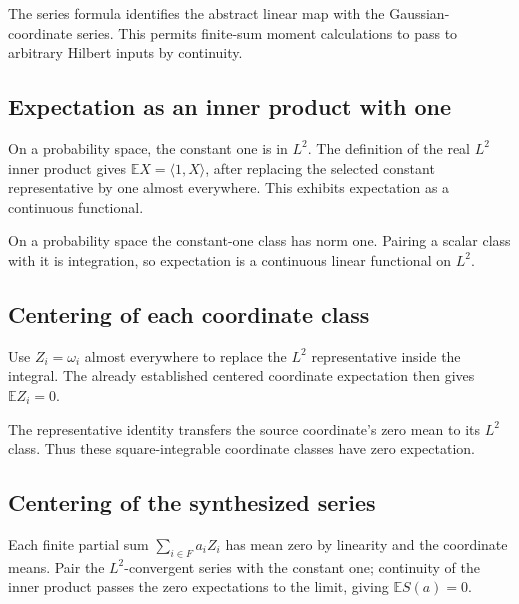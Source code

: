 \documentclass[11pt,a4paper]{report}
\begin{document}
The series formula identifies the abstract linear map with the Gaussian-coordinate series. This permits finite-sum moment calculations to pass to arbitrary Hilbert inputs by continuity.

\subsection{\texorpdfstring{Expectation as an inner product with one}{Expectation as an inner product with one}}
\label{report-step-UnadjustedLangevin-GaussianHilbert-lean-14}


On a probability space, the constant one is in \(L^2\). The definition of the real \(L^2\) inner product gives \(\mathbb EX=\langle1,X\rangle\), after replacing the selected constant representative by one almost everywhere. This exhibits expectation as a continuous functional.



On a probability space the constant-one class has norm one. Pairing a scalar class with it is integration, so expectation is a continuous linear functional on \(L^2\).

\subsection{\texorpdfstring{Centering of each coordinate class}{Centering of each coordinate class}}
\label{report-step-UnadjustedLangevin-GaussianHilbert-lean-15}


Use \(Z_i=\omega_i\) almost everywhere to replace the \(L^2\) representative inside the integral. The already established centered coordinate expectation then gives \(\mathbb EZ_i=0\).



The representative identity transfers the source coordinate's zero mean to its \(L^2\) class. Thus these square-integrable coordinate classes have zero expectation.

\subsection{\texorpdfstring{Centering of the synthesized series}{Centering of the synthesized series}}
\label{report-step-UnadjustedLangevin-GaussianHilbert-lean-16}


Each finite partial sum \(\sum_{i\in F}a_iZ_i\) has mean zero by linearity and the coordinate means. Pair the \(L^2\)-convergent series with the constant one; continuity of the inner product passes the zero expectations to the limit, giving \(\mathbb ES(a)=0\).
\end{document}
